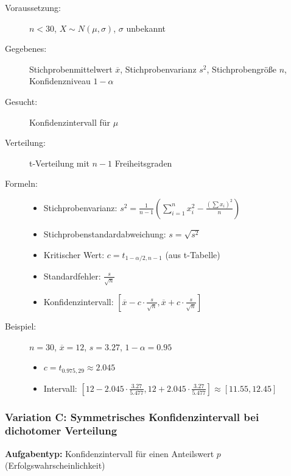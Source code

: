 \documentclass[12pt, a4paper, titlepage, ngerman]{scrartcl}
\begin{document}
\begin{description}
  \item[Voraussetzung:] $n < 30$, $X \sim N(\mu, \sigma)$, $\sigma$ unbekannt
  \item[Gegebenes:] Stichprobenmittelwert $\overline{x}$, Stichprobenvarianz $s^2$, Stichprobengröße $n$, Konfidenzniveau $1 - \alpha$
  \item[Gesucht:] Konfidenzintervall für $\mu$
  \item[Verteilung:] t-Verteilung mit $n-1$ Freiheitsgraden
  \item[Formeln:] 
    \begin{itemize}
      \item Stichprobenvarianz: $s^2 = \frac{1}{n-1} \left(\sum_{i=1}^n x_i^2 - \frac{(\sum x_i)^2}{n}\right)$
      \item Stichprobenstandardabweichung: $s = \sqrt{s^2}$
      \item Kritischer Wert: $c = t_{1 - \alpha/2, n-1}$ (aus t-Tabelle)
      \item Standardfehler: $\frac{s}{\sqrt{n}}$
      \item Konfidenzintervall: $\left[\overline{x} - c \cdot \frac{s}{\sqrt{n}}, \overline{x} + c \cdot \frac{s}{\sqrt{n}}\right]$
    \end{itemize}
  \item[Beispiel:] $n = 30$, $\overline{x} = 12$, $s = 3.27$, $1 - \alpha = 0.95$
    \begin{itemize}
      \item $c = t_{0.975, 29} \approx 2.045$
      \item Intervall: $[12 - 2.045 \cdot \frac{3.27}{5.477}, 12 + 2.045 \cdot \frac{3.27}{5.477}] \approx [11.55, 12.45]$
    \end{itemize}
\end{description}

\subsubsection{Variation C: Symmetrisches Konfidenzintervall bei dichotomer Verteilung}

\textbf{Aufgabentyp:} Konfidenzintervall für einen Anteilswert $p$ (Erfolgswahrscheinlichkeit)
\end{document}
